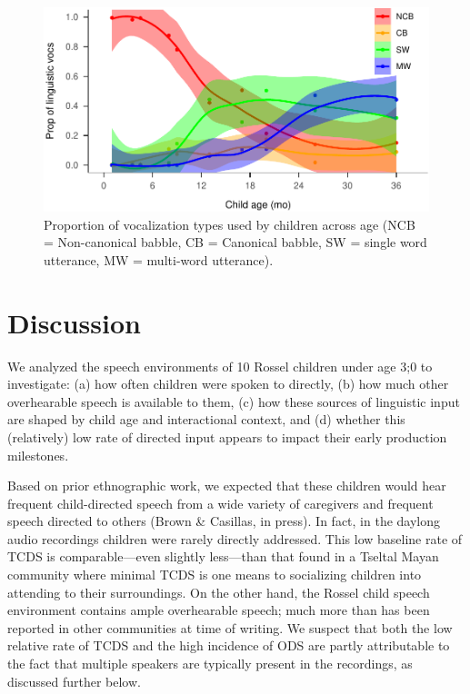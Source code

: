 \documentclass[,man,floatsintext]{apa6}
\begin{document}
\begin{figure}
\centering
\includegraphics{Yeli-CLE_files/figure-latex/fig4-1.pdf}
\caption{\label{fig:fig4}Proportion of vocalization types used by children
across age (NCB = Non-canonical babble, CB = Canonical babble, SW =
single word utterance, MW = multi-word utterance).}
\end{figure}

\section{Discussion}\label{disc}

We analyzed the speech environments of 10 Rossel children under age 3;0
to investigate: (a) how often children were spoken to directly, (b) how
much other overhearable speech is available to them, (c) how these
sources of linguistic input are shaped by child age and interactional
context, and (d) whether this (relatively) low rate of directed input
appears to impact their early production milestones.

Based on prior ethnographic work, we expected that these children would
hear frequent child-directed speech from a wide variety of caregivers
and frequent speech directed to others (Brown \& Casillas, in press). In
fact, in the daylong audio recordings children were rarely directly
addressed. This low baseline rate of TCDS is comparable---even slightly
less---than that found in a Tseltal Mayan community where minimal TCDS
is one means to socializing children into attending to their
surroundings. On the other hand, the Rossel child speech environment
contains ample overhearable speech; much more than has been reported in
other communities at time of writing. We suspect that both the low
relative rate of TCDS and the high incidence of ODS are partly
attributable to the fact that multiple speakers are typically present in
the recordings, as discussed further below.
\end{document}
